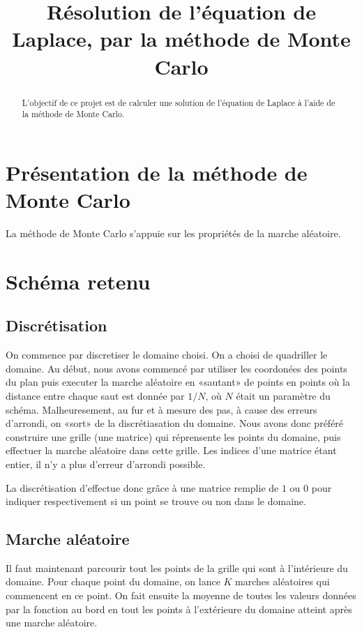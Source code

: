 \documentclass[11pt, a4paper]{article}
\title{Résolution de l'équation de Laplace, par la méthode de Monte Carlo}
\begin{document}
\maketitle
\begin{abstract}
	L'objectif de ce projet est de calculer une solution de l'équation de Laplace à l'aide de la
	méthode de Monte Carlo.
\end{abstract}


\section{Présentation de la méthode de Monte Carlo}

La méthode de Monte Carlo s'appuie sur les propriétés de la marche aléatoire. 

\section{Schéma retenu}

\subsection{Discrétisation}
On commence par discretiser le domaine choisi. On a choisi de quadriller le domaine.  Au début, nous
avons commencé par utiliser les coordonées des points du plan puis executer la marche aléatoire en
«sautant» de points en points où la distance entre chaque saut est donnée par $1/N$, où $N$ était un
paramètre du schéma.  Malheuresement, au fur et à mesure des pas, à cause des erreurs d'arrondi, on
«sort» de la discrétiasation du domaine. Nous avons donc préféré construire une grille (une matrice)
qui réprensente les points du domaine, puis effectuer la marche aléatoire dans cette grille. Les
indices d'une matrice étant entier, il n'y a plus d'erreur d'arrondi possible.

La discrétisation d'effectue donc grâce à une matrice remplie de $1$ ou $0$ pour indiquer
respectivement si un point se trouve ou non dans le domaine.

\subsection{Marche aléatoire}

Il faut maintenant parcourir tout les points de la grille qui sont à l'intérieure du domaine.
Pour chaque point du domaine, on lance $K$  marches aléatoires qui commencent en ce point. On fait
ensuite la moyenne de toutes les valeurs données par la fonction au bord en tout les points à
l'extérieure du domaine atteint après une marche aléatoire.
\end{document}
